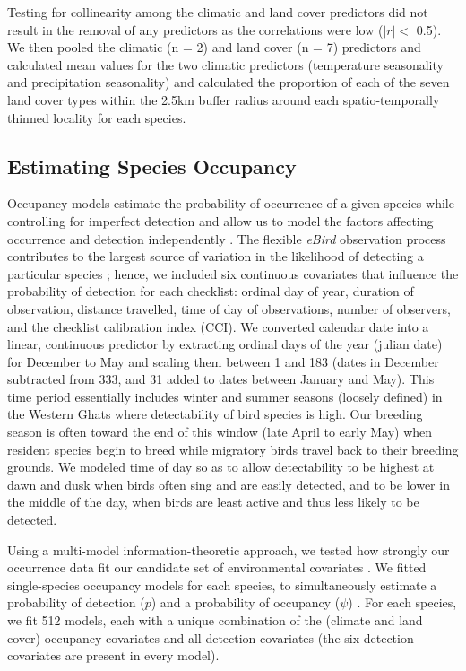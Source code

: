 Testing for collinearity among the climatic and land cover predictors did not result in the removal of any predictors as the correlations were low ($|r| <$ 0.5).
We then pooled the climatic (n = 2) and land cover (n = 7) predictors and calculated mean values for the two climatic predictors (temperature seasonality and precipitation seasonality) and calculated the proportion of each of the seven land cover types within the 2.5km buffer radius around each spatio-temporally thinned locality for each species.

\subsection*{Estimating Species Occupancy}

Occupancy models estimate the probability of occurrence of a given species while controlling for imperfect detection and allow us to model the factors affecting occurrence and detection independently \citep{mackenzie2017,johnston2018}.
The flexible \textit{eBird} observation process contributes to the largest source of variation in the likelihood of detecting a particular species \citep{johnston2021}; hence, we included six continuous covariates that influence the probability of detection for each checklist: ordinal day of year, duration of observation, distance travelled, time of day of observations, number of observers, and the checklist calibration index (CCI).
We converted calendar date into a linear, continuous predictor by extracting ordinal days of the year (julian date) for December to May and scaling them between 1 and 183 (dates in December subtracted from 333, and 31 added to dates between January and May).
This time period essentially includes winter and summer seasons (loosely defined) in the Western Ghats where detectability of bird species is high.
Our breeding season is often toward the end of this window (late April to early May) when resident species begin to breed while migratory birds travel back to their breeding grounds.
We modeled time of day so as to allow detectability to be highest at dawn and dusk when birds often sing and are easily detected, and to be lower in the middle of the day, when birds are least active and thus less likely to be detected.

Using a multi-model information-theoretic approach, we tested how strongly our occurrence data fit our candidate set of environmental covariates \citep{burnham2002}.
We fitted single-species occupancy models for each species, to simultaneously estimate a probability of detection ($p$) and a probability of occupancy ($\psi$) \citep{mackenzie2002,fiske2011}.
For each species, we fit 512 models, each with a unique combination of the (climate and land cover) occupancy covariates and all detection covariates (the six detection covariates are present in every model).

